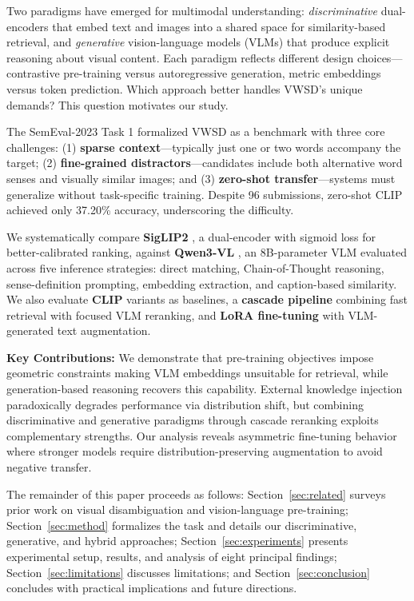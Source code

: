 \documentclass[11pt]{article}
\begin{document}
Two paradigms have emerged for multimodal understanding: \textit{discriminative} dual-encoders that embed text and images into a shared space for similarity-based retrieval, and \textit{generative} vision-language models (VLMs) that produce explicit reasoning about visual content. Each paradigm reflects different design choices---contrastive pre-training versus autoregressive generation, metric embeddings versus token prediction. Which approach better handles VWSD's unique demands? This question motivates our study.

The SemEval-2023 Task 1 \cite{raganato2023semeval} formalized VWSD as a benchmark with three core challenges: (1) \textbf{sparse context}---typically just one or two words accompany the target; (2) \textbf{fine-grained distractors}---candidates include both alternative word senses and visually similar images; and (3) \textbf{zero-shot transfer}---systems must generalize without task-specific training. Despite 96 submissions, zero-shot CLIP achieved only 37.20\% accuracy, underscoring the difficulty.

We systematically compare \textbf{SigLIP2} \cite{zhai2023siglip}, a dual-encoder with sigmoid loss for better-calibrated ranking, against \textbf{Qwen3-VL} \cite{yang2025qwen3}, an 8B-parameter VLM evaluated across five inference strategies: direct matching, Chain-of-Thought reasoning, sense-definition prompting, embedding extraction, and caption-based similarity. We also evaluate \textbf{CLIP} variants \cite{radford2021clip} as baselines, a \textbf{cascade pipeline} combining fast retrieval with focused VLM reranking, and \textbf{LoRA fine-tuning} with VLM-generated text augmentation.

\noindent\textbf{Key Contributions:} We demonstrate that pre-training objectives impose geometric constraints making VLM embeddings unsuitable for retrieval, while generation-based reasoning recovers this capability. External knowledge injection paradoxically degrades performance via distribution shift, but combining discriminative and generative paradigms through cascade reranking exploits complementary strengths. Our analysis reveals asymmetric fine-tuning behavior where stronger models require distribution-preserving augmentation to avoid negative transfer.

The remainder of this paper proceeds as follows: Section~\ref{sec:related} surveys prior work on visual disambiguation and vision-language pre-training; Section~\ref{sec:method} formalizes the task and details our discriminative, generative, and hybrid approaches; Section~\ref{sec:experiments} presents experimental setup, results, and analysis of eight principal findings; Section~\ref{sec:limitations} discusses limitations; and Section~\ref{sec:conclusion} concludes with practical implications and future directions.
\end{document}
